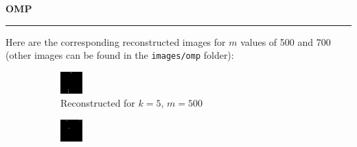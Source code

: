 \documentclass[a4paper,12pt]{article}
\newenvironment{solution}[2][]{%
    \begin{mdframed}[linecolor=blue!70!black, linewidth=2pt, roundcorner=10pt, backgroundcolor=yellow!10!white, skipabove=12pt, skipbelow=12pt]%
        \textbf{\large #2}
        \par\noindent\rule{\textwidth}{0.4pt}
}{
    \end{mdframed}
}
\begin{document}
\begin{solution}{OMP}
Here are the corresponding reconstructed images for $m$ values of 500 and 700 (other images can be found in the \texttt{images/omp} folder):

\begin{figure}[H]
  \centering
  \begin{subfigure}[t]{0.32\textwidth}
      \centering
      \includegraphics[width=\textwidth]{../images/omp/Reconstructed_k_5_m_500.png}
      \caption{Reconstructed for $k = 5$, $m = 500$}
  \end{subfigure}
  \begin{subfigure}[t]{0.32\textwidth}
      \centering
      \includegraphics[width=\textwidth]{../images/omp/Reconstructed_k_5_m_700.png}

\end{subfigure}
\end{figure}
\end{solution}
\end{document}
